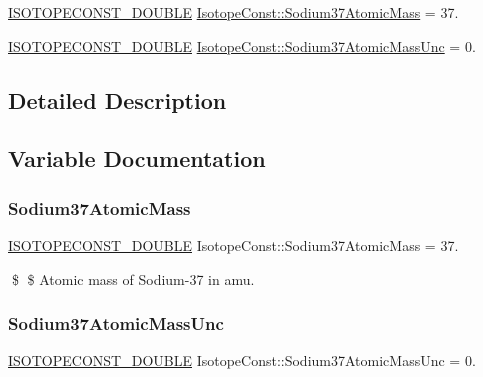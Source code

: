 \begin{DoxyCompactItemize}
\item 
\mbox{\hyperlink{group___isotope_const-_macros_ga8f45a7272ce02c0b4c65c44636ed719a}{I\+S\+O\+T\+O\+P\+E\+C\+O\+N\+S\+T\+\_\+\+D\+O\+U\+B\+LE}} \mbox{\hyperlink{group___isotope_const-_sodium-_na37_ga668e90ab846441f4192e722c00db97fe}{Isotope\+Const\+::\+Sodium37\+Atomic\+Mass}} = 37.
\item 
\mbox{\hyperlink{group___isotope_const-_macros_ga8f45a7272ce02c0b4c65c44636ed719a}{I\+S\+O\+T\+O\+P\+E\+C\+O\+N\+S\+T\+\_\+\+D\+O\+U\+B\+LE}} \mbox{\hyperlink{group___isotope_const-_sodium-_na37_ga02bdd31cf8d89074d182f38edf7d4db0}{Isotope\+Const\+::\+Sodium37\+Atomic\+Mass\+Unc}} = 0.
\end{DoxyCompactItemize}


\subsection{Detailed Description}


\subsection{Variable Documentation}
\mbox{\label{group___isotope_const-_sodium-_na37_ga668e90ab846441f4192e722c00db97fe}} 
\subsubsection{\texorpdfstring{Sodium37\+Atomic\+Mass}{Sodium37AtomicMass}}
{\footnotesize\ttfamily \mbox{\hyperlink{group___isotope_const-_macros_ga8f45a7272ce02c0b4c65c44636ed719a}{I\+S\+O\+T\+O\+P\+E\+C\+O\+N\+S\+T\+\_\+\+D\+O\+U\+B\+LE}} Isotope\+Const\+::\+Sodium37\+Atomic\+Mass = 37.}

\$ \$ Atomic mass of Sodium-\/37 in amu. \mbox{\label{group___isotope_const-_sodium-_na37_ga02bdd31cf8d89074d182f38edf7d4db0}} 
\subsubsection{\texorpdfstring{Sodium37\+Atomic\+Mass\+Unc}{Sodium37AtomicMassUnc}}
{\footnotesize\ttfamily \mbox{\hyperlink{group___isotope_const-_macros_ga8f45a7272ce02c0b4c65c44636ed719a}{I\+S\+O\+T\+O\+P\+E\+C\+O\+N\+S\+T\+\_\+\+D\+O\+U\+B\+LE}} Isotope\+Const\+::\+Sodium37\+Atomic\+Mass\+Unc = 0.}

